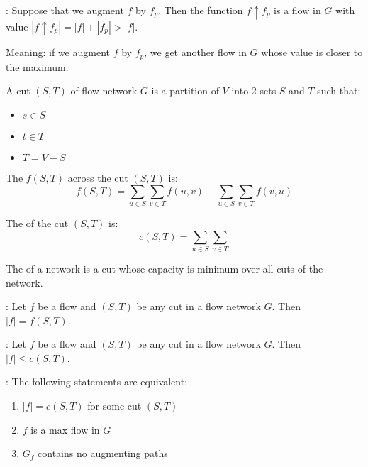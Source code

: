       \par {}: Suppose that we augment $f$ by $f_p$. Then the function $f \uparrow f_p$ is a flow in $G$ with value $|f \uparrow f_p| = |f| + |f_p| > |f|$.
      \par Meaning: if we augment $f$ by $f_p$, we get another flow in $G$ whose value is closer to the maximum.

      \par A cut $(S, T)$ of flow network $G$ is a partition of $V$ into 2 sets $S$ and $T$ such that:
      \begin{itemize}
        \item $s \in S$
        \item $t \in T$
        \item $T = V - S$
      \end{itemize}
      \par The  $f(S, T)$ across the cut $(S, T)$ is:
        \[
          f(S, T) = \sum\limits_{u \in S} \sum\limits_{v \in T} f(u, v)
                  - \sum\limits_{u \in S} \sum\limits_{v \in T} f(v, u)
        \]
      \par The  of the cut $(S, T)$ is:
        \[
          c(S, T) = \sum\limits_{u \in S} \sum\limits_{v \in T}
        \]
      \par The  of a network is a cut whose capacity is minimum over all cuts of the network.

      \par {}: Let $f$ be a flow and $(S, T)$ be any cut in a flow network $G$. Then $|f| = f(S, T)$.

      \par {}: Let $f$ be a flow and $(S, T)$ be any cut in a flow network $G$. Then $|f| \leq c(S, T)$.

      \par {}: The following statements are equivalent:
        \begin{enumerate}
          \item $|f| = c(S, T)$ for some cut $(S, T)$
          \item $f$ is a max flow in $G$
          \item $G_f$ contains no augmenting paths
        \end{enumerate}

